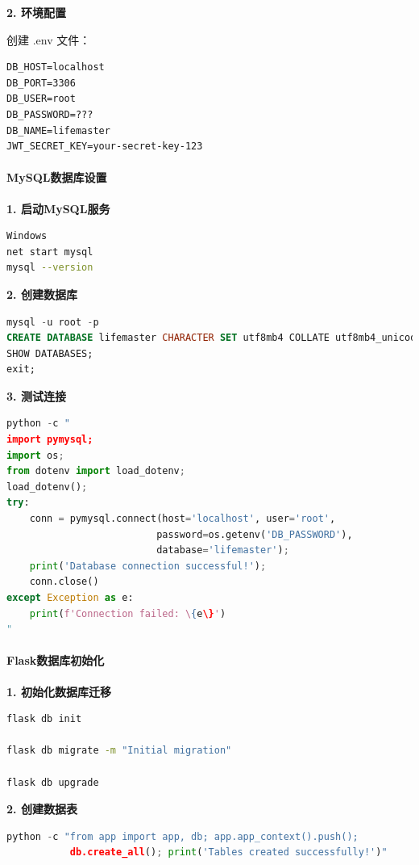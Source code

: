 \documentclass[a4paper]{article}
\begin{document}
\textbf{2. 环境配置}

创建 .env 文件：
\begin{lstlisting}[basicstyle=\ttfamily]
DB_HOST=localhost
DB_PORT=3306
DB_USER=root
DB_PASSWORD=???
DB_NAME=lifemaster
JWT_SECRET_KEY=your-secret-key-123
\end{lstlisting}

\paragraph{MySQL数据库设置}

\textbf{1. 启动MySQL服务}

\begin{lstlisting}[language=bash]
Windows
net start mysql
mysql --version
\end{lstlisting}

\textbf{2. 创建数据库}

\begin{lstlisting}[language=sql]
mysql -u root -p
CREATE DATABASE lifemaster CHARACTER SET utf8mb4 COLLATE utf8mb4_unicode_ci;
SHOW DATABASES;
exit;
\end{lstlisting}

\textbf{3. 测试连接}

\begin{lstlisting}[language=python]
python -c "
import pymysql;
import os;
from dotenv import load_dotenv;
load_dotenv();
try:
    conn = pymysql.connect(host='localhost', user='root', 
                          password=os.getenv('DB_PASSWORD'), 
                          database='lifemaster');
    print('Database connection successful!');
    conn.close()
except Exception as e:
    print(f'Connection failed: \{e\}')
"
\end{lstlisting}

\paragraph{Flask数据库初始化}

\textbf{1. 初始化数据库迁移}

\begin{lstlisting}[language=bash]
flask db init

flask db migrate -m "Initial migration"

flask db upgrade
\end{lstlisting}

\textbf{2. 创建数据表}

\begin{lstlisting}[language=python]
python -c "from app import app, db; app.app_context().push(); 
           db.create_all(); print('Tables created successfully!')"
\end{lstlisting}
\end{document}
